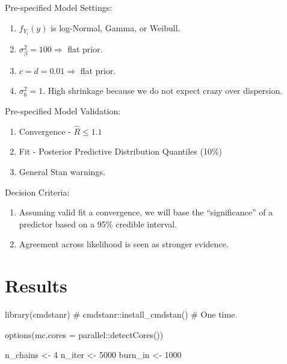 \documentclass[
  letterpaper,
]{article}
\newenvironment{Shaded}{\begin{snugshade}}{\end{snugshade}}
\newcommand{\AttributeTok}[1]{\textcolor[rgb]{0.40,0.45,0.13}{#1}}
\newcommand{\CommentTok}[1]{\textcolor[rgb]{0.37,0.37,0.37}{#1}}
\newcommand{\DecValTok}[1]{\textcolor[rgb]{0.68,0.00,0.00}{#1}}
\newcommand{\FunctionTok}[1]{\textcolor[rgb]{0.28,0.35,0.67}{#1}}
\newcommand{\NormalTok}[1]{\textcolor[rgb]{0.00,0.23,0.31}{#1}}
\newcommand{\OtherTok}[1]{\textcolor[rgb]{0.00,0.23,0.31}{#1}}
\newcommand{\SpecialCharTok}[1]{\textcolor[rgb]{0.37,0.37,0.37}{#1}}
\begin{document}
Pre-specified Model Settings:

\begin{enumerate}
\def\labelenumi{\arabic{enumi}.}
\item
  \(f_{Y_i}(y)\) is log-Normal, Gamma, or Weibull.
\item
  \(\sigma^2_\beta=100 \Rightarrow\) flat prior.
\item
  \(c = d = 0.01 \Rightarrow\) flat prior.
\item
  \(\sigma^2_b = 1\). High shrinkage because we do not expect crazy over
  dispersion.
\end{enumerate}

Pre-specified Model Validation:

\begin{enumerate}
\def\labelenumi{\arabic{enumi}.}
\item
  Convergence - \(\hat R \leq 1.1\)
\item
  Fit - Posterior Predictive Distribution Quantiles (10\%)
\item
  General Stan warnings.
\end{enumerate}

Decision Criteria:

\begin{enumerate}
\def\labelenumi{\arabic{enumi}.}
\item
  Assuming valid fit a convergence, we will base the ``significance'' of
  a predictor based on a 95\% credible interval.
\item
  Agreement across likelihood is seen as stronger evidence.
\end{enumerate}

\section{Results}\label{results}

\begin{Shaded}
\begin{Highlighting}[]
\FunctionTok{library}\NormalTok{(cmdstanr)}
\CommentTok{\# cmdstanr::install\_cmdstan() \# One time. }

\FunctionTok{options}\NormalTok{(}\AttributeTok{mc.cores =}\NormalTok{ parallel}\SpecialCharTok{::}\FunctionTok{detectCores}\NormalTok{())}

\NormalTok{n\_chains }\OtherTok{\textless{}{-}} \DecValTok{4}
\NormalTok{n\_iter }\OtherTok{\textless{}{-}} \DecValTok{5000}
\NormalTok{burn\_in }\OtherTok{\textless{}{-}} \DecValTok{1000}
\end{Highlighting}
\end{Shaded}
\end{document}
